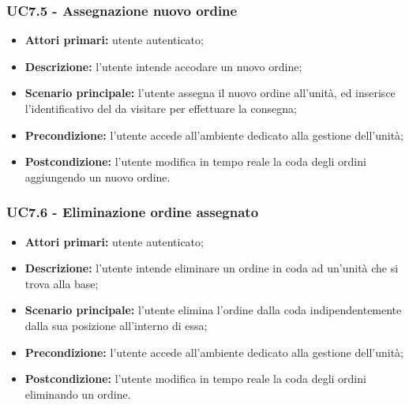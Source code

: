         \subsubsection{UC7.5 - Assegnazione nuovo ordine}
        \begin{itemize}
            \item \textbf{Attori primari:} utente autenticato;
            \item \textbf{Descrizione:} l'utente intende accodare un nuovo ordine;
            \item \textbf{Scenario principale:} l'utente assegna il nuovo ordine all'unità, ed inserisce l'identificativo del  da visitare per effettuare la consegna;
            \item \textbf{Precondizione:} l'utente accede all'ambiente dedicato alla gestione dell'unità;
            \item \textbf{Postcondizione:} l'utente modifica in tempo reale la coda degli ordini aggiungendo un nuovo ordine.
        \end{itemize}

        \subsubsection{UC7.6 - Eliminazione ordine assegnato}
        \begin{itemize}
            \item \textbf{Attori primari:} utente autenticato;
            \item \textbf{Descrizione:} l'utente intende eliminare un ordine in coda ad un'unità che si trova alla base;
            \item \textbf{Scenario principale:} l'utente elimina l'ordine dalla coda indipendentemente dalla sua posizione all'interno di essa;
            \item \textbf{Precondizione:} l'utente accede all'ambiente dedicato alla gestione dell'unità;
            \item \textbf{Postcondizione:} l'utente modifica in tempo reale la coda degli ordini eliminando un ordine.
        \end{itemize}
